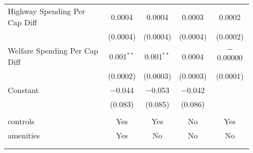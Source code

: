 \begin{table}[!htbp]
\begin{tabular}{@{\extracolsep{5pt}}lcccc}
  Highway Spending Per Cap Diff & 0.0004 & 0.0004 & 0.0003 & 0.0002 \\ 
  & (0.0004) & (0.0004) & (0.0004) & (0.0002) \\ 
  Welfare Spending Per Cap Diff & 0.001$^{**}$ & 0.001$^{**}$ & 0.0004 & $-$0.00000 \\ 
  & (0.0002) & (0.0003) & (0.0003) & (0.0001) \\ 
  Constant & $-$0.044 & $-$0.053 & $-$0.042 &  \\ 
  & (0.083) & (0.085) & (0.086) &  \\ 
 \hline \\[-1.8ex] 
controls & Yes & Yes & No & Yes \\ 
amenities & Yes & No & No & No \\ 
\hline \\[-1.8ex] 
\hline 
\hline \\[-1.8ex] 
\end{tabular} 
\end{table} 
